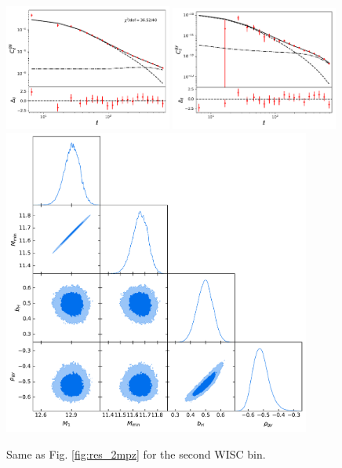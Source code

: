 \documentclass{article}
\begin{document}
  \begin{figure}
    \centering
    \includegraphics[width = 0.49\textwidth]{../output_test/sampler_minimal_hmc_wisc2_cls_wisc2_wisc2}
    \includegraphics[width = 0.49\textwidth]{../output_test/sampler_minimal_hmc_wisc2_cls_wisc2_y_milca}
    \includegraphics[width = 0.90\textwidth]{../output_test/sampler_minimal_hmc_wisc2_triangle}
    \caption{Same as Fig. \ref{fig:res_2mpz} for the second WISC bin.}\label{fig:res_wisc2}
  \end{figure}
\end{document}
